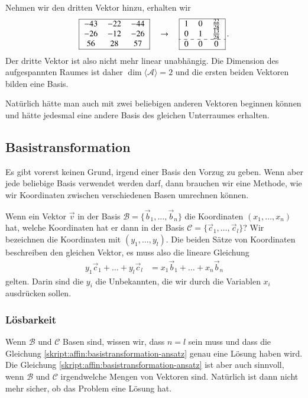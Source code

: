 \begin{beispiel}
Nehmen wir den dritten Vektor hinzu, erhalten wir
\[
\begin{tabular}{|>{$}c<{$}>{$}c<{$}>{$}c<{$}|}
\hline
  -43&  -22&  -44\\
  -26&  -12&  -26\\
   56&   28&   57\\
\hline
\end{tabular}
\quad\rightarrow\quad
\begin{tabular}{|>{$}c<{$}>{$}c<{$}>{$}c<{$}|}
\hline
1&0&\frac{22}{28}\\
0&1&\frac{13}{28}\\
\hdashline
0&0&0\\
\hline
\end{tabular}\,.
\]
Der dritte Vektor ist also nicht mehr linear unabhängig. 
Die Dimension des aufgespannten Raumes ist daher
$\dim\langle\mathcal{A}\rangle=2$ und die ersten
beiden Vektoren bilden eine Basis.

Natürlich hätte man auch mit zwei beliebigen anderen Vektoren
beginnen können und hätte jedesmal eine andere Basis des gleichen
Unterraumes erhalten.
\end{beispiel}


%
%
\subsection{Basistransformation}
Es gibt vorerst keinen Grund, irgend einer Basis den Vorzug zu geben.
Wenn aber jede beliebige Basis verwendet werden darf, dann
brauchen wir eine Methode, wie wir Koordinaten zwischen verschiedenen
Basen umrechnen können.

\begin{aufgabe}
\label{skript:affin:basiswechsel:aufgabe}
Wenn ein Vektor $\vec{v}$ in der Basis
$\mathcal{B}=\{\vec{b}_1,\dots,\vec{b}_n\}$
die Koordinaten $(x_1,\dots,x_n)$ hat, welche Koordinaten hat er dann in
der Basis $\mathcal{C}=\{\vec{c}_1,\dots,\vec{c}_l\}$?
Wir bezeichnen die Koordinaten mit $(y_1,\dots,y_l)$.
Die beiden Sätze von Koordinaten beschreiben den gleichen Vektor,
es muss also die lineare Gleichung
\begin{align}
y_1\vec{c}_1 + \dots + y_l\vec{c}_l
&=
x_1\vec{b}_1 + \dots + x_n\vec{b}_n
\label{skript:affin:basistransformation-ansatz}
\end{align}
gelten.
Darin sind die $y_i$ die Unbekannten, die wir durch die Variablen $x_i$
ausdrücken sollen.
\end{aufgabe}

\subsubsection{Lösbarkeit}
Wenn $\mathcal{B}$ und $\mathcal{C}$ Basen sind, wissen wir, dass
$n=l$ sein muss und dass die Gleichung
\eqref{skript:affin:basistransformation-ansatz}
genau eine Lösung haben wird.
Die Gleichung
\eqref{skript:affin:basistransformation-ansatz}
ist aber auch sinnvoll, wenn $\mathcal{B}$ und $\mathcal{C}$ irgendwelche
Mengen von Vektoren sind.
Natürlich ist dann nicht mehr sicher, ob das Problem eine Lösung hat.

